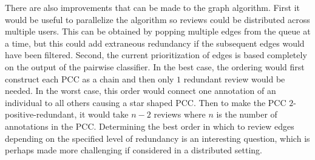     There are also improvements that can be made to the graph algorithm.
    First it would be useful to parallelize the algorithm so reviews could be distributed across multiple users.
    This can be obtained by popping multiple edges from the queue at a time, but this could add extraneous
      redundancy if the subsequent edges would have been filtered.
    Second, the current prioritization of edges is based completely on the output of the pairwise classifier.
    In the best case, the ordering would first construct each PCC as a chain and then only $1$ redundant review
      would be needed.
    In the worst case, this order would connect one annotation of an individual to all others causing a star
      shaped PCC.
    Then to make the PCC $2$-positive-redundant, it would take $n - 2$ reviews where $n$ is the number of
      annotations in the PCC.
    Determining the best order in which to review edges depending on the specified level of redundancy is an
      interesting question, which is perhaps made more challenging if considered in a distributed setting.


